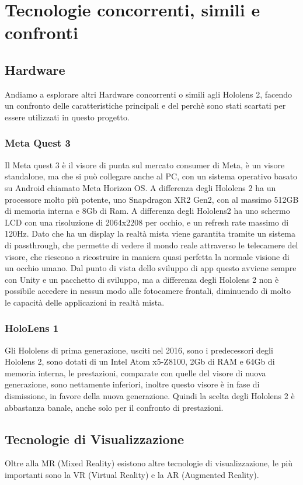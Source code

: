 \chapter{Tecnologie concorrenti, simili e confronti}
\pagestyle{plain}

\section{Hardware}
Andiamo a esplorare altri Hardware concorrenti o simili agli Hololens 2, facendo un confronto delle caratteristiche principali e del perchè sono stati scartati per essere utilizzati in questo progetto.
\subsection{Meta Quest 3}
Il Meta quest 3 è il visore di punta sul mercato consumer di Meta, è un visore standalone, ma che si può collegare anche al PC, con un sistema operativo basato su Android chiamato Meta Horizon OS. A differenza degli Hololens 2 ha un processore molto più potente, uno Snapdragon XR2 Gen2, con al massimo 512GB di memoria interna e 8Gb di Ram. A differenza degli Hololens2 ha uno schermo LCD con una risoluzione di 2064x2208 per occhio, e un refresh rate massimo di 120Hz. Dato che ha un display la realtà mista viene garantita tramite un sistema di passthrough, che permette di vedere il mondo reale attraverso le telecamere del visore, che riescono a ricostruire in maniera quasi perfetta la normale visione di un occhio umano. Dal punto di vista dello sviluppo di app questo avviene sempre con Unity e un pacchetto di sviluppo, ma a differenza degli Hololens 2 non è possibile accedere in nessun modo alle fotocamere frontali, diminuendo di molto le capacità delle applicazioni in realtà mista.
\subsection{HoloLens 1}
Gli Hololens di prima generazione, usciti nel 2016, sono i predecessori degli Hololens 2, sono dotati di un Intel Atom x5-Z8100, 2Gb di RAM e 64Gb di memoria interna, le prestazioni, comparate con quelle del visore di nuova generazione, sono nettamente inferiori, inoltre questo visore è in fase di dismissione, in favore della nuova generazione. Quindi la scelta degli Hololens 2 è abbastanza banale, anche solo per il confronto di prestazioni.

\section{Tecnologie di Visualizzazione}
Oltre alla MR (Mixed Reality) esistono altre tecnologie di visualizzazione, le più importanti sono la VR (Virtual Reality) e la AR (Augmented Reality).
